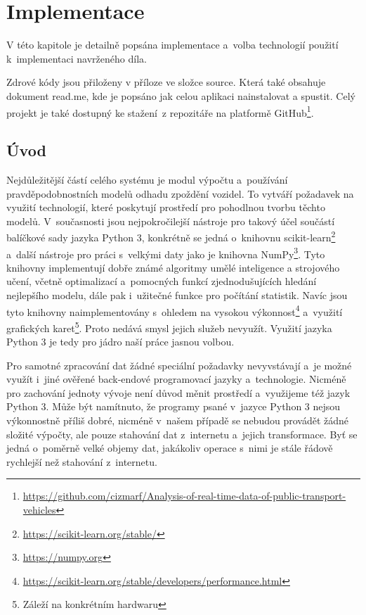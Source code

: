 

\chapter{Implementace} \label{chapter:implementace}


V této kapitole je detailně popsána implementace a~volba technologií použití k~implementaci navrženého díla.

\bigbreak

Zdrové kódy jsou přiloženy v příloze ve složce source. Která také obsahuje dokument read.me, kde je popsáno jak celou aplikaci nainstalovat a spustit. Celý projekt je také dostupný ke stažení z repozitáře na platformě GitHub\footnote{\url{https://github.com/cizmarf/Analysis-of-real-time-data-of-public-transport-vehicles}}.

\section{Úvod}

Nejdůležitější částí celého systému je modul výpočtu a~používání pravděpodobnostních modelů odhadu zpoždění vozidel. To vytváří požadavek na využití technologií, které poskytují prostředí pro pohodlnou tvorbu těchto modelů. V~současnosti jsou nejpokročilejší nástroje pro takový účel součástí balíčkové sady jazyka Python 3, konkrétně se jedná o~knihovnu scikit-learn\footnote{\url{https://scikit-learn.org/stable/}} a~další nástroje pro práci s~velkými daty jako je knihovna NumPy\footnote{\url{https://numpy.org}}. Tyto knihovny implementují dobře známé algoritmy umělé inteligence a strojového učení, včetně optimalizací a~pomocných funkcí zjednodušujících hledání nejlepšího modelu, dále pak i~užitečné funkce pro počítání statistik. Navíc jsou tyto knihovny naimplementovány s~ohledem na vysokou výkonnost\footnote{\url{https://scikit-learn.org/stable/developers/performance.html}} a~využití grafických karet\footnote{Záleží na konkrétním hardwaru}. Proto nedává smysl jejich služeb nevyužít. Využití jazyka Python 3 je tedy pro jádro naší práce jasnou volbou.


\bigbreak


Pro samotné zpracování dat žádné speciální požadavky nevyvstávají a~je možné využít i~jiné ověřené back-endové programovací jazyky a~technologie. Nicméně pro zachování jednoty vývoje není důvod měnit prostředí a~využijeme též jazyk Python 3. Může být namítnuto, že programy psané v~jazyce Python 3 nejsou výkonnostně příliš dobré, nicméně v~našem případě se nebudou provádět žádné složité výpočty, ale pouze stahování dat z~internetu a~jejich transformace. Byť se jedná o~poměrně velké objemy dat, jakákoliv operace s~nimi je stále řádově rychlejší než stahování z~internetu.


